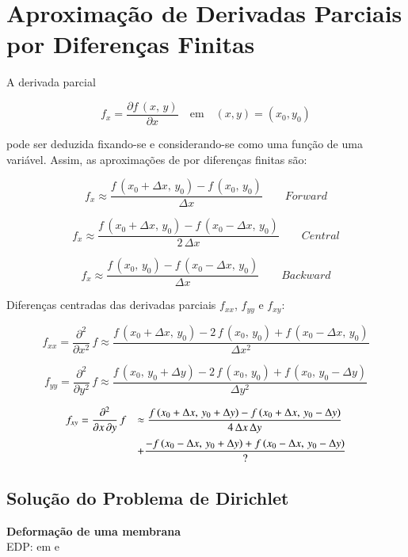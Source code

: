 \section{Aproximação de Derivadas Parciais por Diferenças Finitas}

A derivada parcial

\[
 f_{x} = \frac{\partial f\,(x,\,y)}{\partial x} \quad \mbox{em} \quad (x,y) = (x_{0},y_{0})
\]

pode ser deduzida fixando-se  e considerando-se  como uma função de uma variável. Assim, as aproximações de  por diferenças finitas são:

\[
 f_{x} \approx \frac{f\,(x_0 + \Delta x,\,y_0) - f\,(x_0,\,y_0)}{\Delta x} \qquad Forward
\]

\[
 f_{x} \approx \frac{f\,(x_0 + \Delta x,\,y_0) - f\,(x_0 - \Delta x,\,y_0)}{2\,\Delta x} \qquad Central
\]

\[
 f_{x} \approx \frac{f\,(x_0,\,y_0) - f\,(x_0 - \Delta x,\,y_0)}{\Delta x} \qquad Backward
\]

Diferenças centradas das derivadas parciais $f_{xx}$, $f_{yy}$ e $f_{xy}$:

\[
 f_{xx} = \frac{\partial^2}{\partial x^2} \, f \approx \frac{f\,(x_0 + \Delta x,\, y_0) - 2\,f\,(x_0,\,y_0) + f\,(x_0 - \Delta x,\,y_0)}{\Delta x^2}
\]

\[
 f_{yy} = \frac{\partial^2}{\partial y^2} \, f \approx \frac{f\,(x_0,\, y_0 + \Delta y) - 2\,f\,(x_0,\,y_0) + f\,(x_0,\, y_0 - \Delta y)}{\Delta y^2}
\]

\[
 \begin{array}{ll}
  f_{xy} = \displaystyle \frac{\partial^2}{\partial x \, \partial y} \, f & \approx \displaystyle \frac{f\,(x_0 + \Delta x,\, y_0 + \Delta y) - f\,(x_0 + \Delta x,\,y_0 - \Delta y)}{4\,\Delta x \, \Delta y} \vspace*{0.2cm} \\
   & + \displaystyle \frac{-f\,(x_0 - \Delta x,\, y_0 + \Delta y) + f\,(x_0 - \Delta x,\, y_0 - \Delta y)}{?}
 \end{array}
\]

\subsection{Solução do Problema de Dirichlet}

\textbf{Deformação de uma membrana}\\

EDP:  em  e  \\

